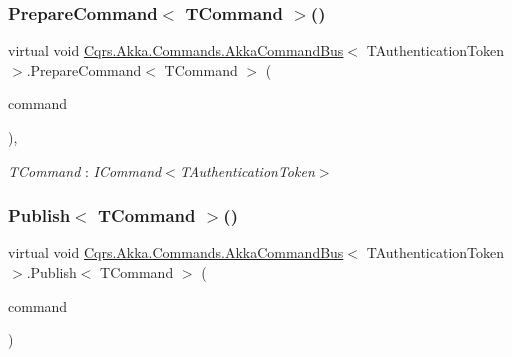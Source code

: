 \subsubsection{\texorpdfstring{Prepare\+Command$<$ T\+Command $>$()}{PrepareCommand< TCommand >()}}
{\footnotesize\ttfamily virtual void \hyperlink{classCqrs_1_1Akka_1_1Commands_1_1AkkaCommandBus}{Cqrs.\+Akka.\+Commands.\+Akka\+Command\+Bus}$<$ T\+Authentication\+Token $>$.Prepare\+Command$<$ T\+Command $>$ (\begin{DoxyParamCaption}\item[{T\+Command}]{command }\end{DoxyParamCaption})\hspace{0.3cm}{\ttfamily [protected]}, {\ttfamily [virtual]}}

\begin{Desc}
\item[Type Constraints]\begin{description}
\item[{\em T\+Command} : {\em I\+Command$<$T\+Authentication\+Token$>$}]\end{description}
\end{Desc}
\mbox{\label{classCqrs_1_1Akka_1_1Commands_1_1AkkaCommandBus_a48e1d46035b1e1a3251636b8a03f7dae}} 
\subsubsection{\texorpdfstring{Publish$<$ T\+Command $>$()}{Publish< TCommand >()}\hspace{0.1cm}{\footnotesize\ttfamily [1/2]}}
{\footnotesize\ttfamily virtual void \hyperlink{classCqrs_1_1Akka_1_1Commands_1_1AkkaCommandBus}{Cqrs.\+Akka.\+Commands.\+Akka\+Command\+Bus}$<$ T\+Authentication\+Token $>$.Publish$<$ T\+Command $>$ (\begin{DoxyParamCaption}\item[{T\+Command}]{command }\end{DoxyParamCaption})\hspace{0.3cm}{\ttfamily [virtual]}}



